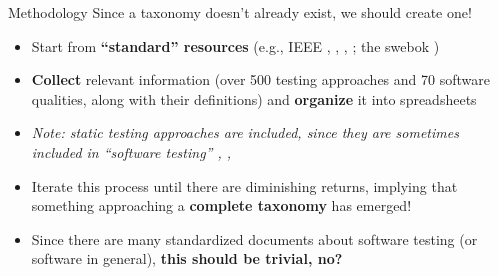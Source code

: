 \documentclass[22pt]{beamer}
\begin{document}
\begin{frame}[fragile]
\begin{textblock}{7.25}
        \begin{block}{\fontsize{37}{20}\selectfont Methodology}
            Since a taxonomy doesn't already exist, we should create one!
            \begin{itemize}
                \item Start from \textbf{``standard'' resources}
                      (e.g., IEEE \cite{IEEE2022}, \cite{IEEE2021},
                      \cite{IEEE2017}, \cite{IEEE2013};
                      the \acs{swebok} \cite{SWEBOK2024})
                \item \textbf{Collect} relevant information (over 500 testing
                      approaches and 70 software qualities, along with their
                      definitions) and \textbf{organize} it into spreadsheets
                \item \emph{Note: static testing approaches are included, since
                          they are sometimes included in ``software testing''
                          \cite[p.~17]{IEEE2022}, \cite[p.~440]{IEEE2017},
                          \cite[p.~5-2]{SWEBOK2024}}
                \item Iterate this process until there are
                      diminishing returns, implying that something approaching
                      a \textbf{complete taxonomy} has emerged!
                \item Since there are many standardized documents about
                      software testing (or software in general),
                      \textbf{this should be trivial, no?}
            \end{itemize}
            \vspace{5mm}
        \end{block}


\end{textblock}
\end{frame}
\end{document}
